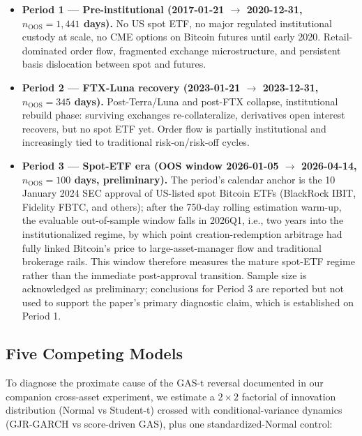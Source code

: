 \begin{itemize}
\item \textbf{Period 1 --- Pre-institutional (2017-01-21 $\rightarrow$ 2020-12-31, $n_{\text{OOS}} = 1{,}441$ days).} No US spot ETF, no major regulated institutional custody at scale, no CME options on Bitcoin futures until early 2020. Retail-dominated order flow, fragmented exchange microstructure, and persistent basis dislocation between spot and futures.

\item \textbf{Period 2 --- FTX-Luna recovery (2023-01-21 $\rightarrow$ 2023-12-31, $n_{\text{OOS}} = 345$ days).} Post-Terra/Luna and post-FTX collapse, institutional rebuild phase: surviving exchanges re-collateralize, derivatives open interest recovers, but no spot ETF yet. Order flow is partially institutional and increasingly tied to traditional risk-on/risk-off cycles.

\item \textbf{Period 3 --- Spot-ETF era (OOS window 2026-01-05 $\rightarrow$ 2026-04-14, $n_{\text{OOS}} = 100$ days, preliminary).} The period's calendar anchor is the 10 January 2024 SEC approval of US-listed spot Bitcoin ETFs (BlackRock IBIT, Fidelity FBTC, and others); after the 750-day rolling estimation warm-up, the evaluable out-of-sample window falls in 2026Q1, i.e., two years into the institutionalized regime, by which point creation-redemption arbitrage had fully linked Bitcoin's price to large-asset-manager flow and traditional brokerage rails. This window therefore measures the mature spot-ETF regime rather than the immediate post-approval transition. Sample size is acknowledged as preliminary; conclusions for Period 3 are reported but not used to support the paper's primary diagnostic claim, which is established on Period 1.
\end{itemize}

\subsection{Five Competing Models}

To diagnose the proximate cause of the GAS-t reversal documented in our companion cross-asset experiment, we estimate a $2 \times 2$ factorial of innovation distribution (Normal vs Student-t) crossed with conditional-variance dynamics (GJR-GARCH vs score-driven GAS), plus one standardized-Normal control:


